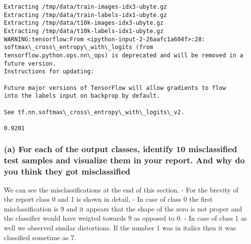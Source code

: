 \documentclass[11pt]{article}
\begin{document}
    \begin{Verbatim}[commandchars=\\\{\}]
Extracting /tmp/data/train-images-idx3-ubyte.gz
Extracting /tmp/data/train-labels-idx1-ubyte.gz
Extracting /tmp/data/t10k-images-idx3-ubyte.gz
Extracting /tmp/data/t10k-labels-idx1-ubyte.gz
WARNING:tensorflow:From <ipython-input-2-26aafc1a604f>:28: softmax\_cross\_entropy\_with\_logits (from tensorflow.python.ops.nn\_ops) is deprecated and will be removed in a future version.
Instructions for updating:

Future major versions of TensorFlow will allow gradients to flow
into the labels input on backprop by default.

See tf.nn.softmax\_cross\_entropy\_with\_logits\_v2.

0.9201

    \end{Verbatim}

    \subsubsection{(a) For each of the output classes, identify 10
misclassified test samples and visualize them in your report. And why do
you think they got
misclassified}\label{a-for-each-of-the-output-classes-identify-10-misclassified-test-samples-and-visualize-them-in-your-report.-and-why-do-you-think-they-got-misclassified}

We can see the misclassifications at the end of this section. - For the
brevity of the report class 0 and 1 is shown in detail, - In case of
class 0 the first misclassification is 9 and it appears that the shape
of the zero is not proper and the classifier would have weigted towards
9 as opposed to 0. - In case of class 1 as well we observed similar
distortions. If the number 1 was in italics then it was classified
sometime as 7.
\end{document}
